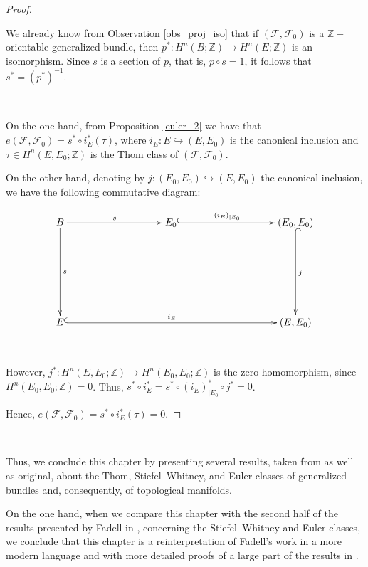 \documentclass[12pt,oneside]{book}
\newcommand{\Z}{\mathbb{Z}}
\begin{document}
    \begin{proof}

        \

    	We already know from Observation \ref{obs_proj_iso} that if $(\mathcal{F},\mathcal{F}_{0})$ is a $\Z-$orientable generalized bundle, 
        then $p^{*}:H^{n}(B;\Z)\to H^{n}(E;\Z)$ is an isomorphism. Since $s$ is a section of $p$, that is, $p\circ s=1$, it follows that 
        $s^{*}=(p^{*})^{-1}$.

        \

    	On the one hand, from Proposition \ref{euler_2} we have that $e(\mathcal{F},\mathcal{F}_{0})=s^{*}\circ i_{E}^{*}(\tau)$, 
        where $i_{E}:E\hookrightarrow (E,E_{0})$ is the canonical inclusion and $\tau\in H^{n}(E,E_{0};\Z)$ is the Thom 
        class of $(\mathcal{F},\mathcal{F}_{0})$.

    	On the other hand, denoting by $j:(E_{0},E_{0})\hookrightarrow (E,E_{0})$ the canonical inclusion, we have the following commutative 
        diagram:

    	$$ \xymatrix @C=0.5cm {
    		B \ar[rrrrr]^-{s} \ar[ddd]^-{s} &&&&& E_{0} \ar@{^(->}[rrrrr]^-{(i_{E})_{|E_{0}}} &&&&& (E_{0},E_{0}) \ar@{^(->}[ddd]^-{j} \\
    		&&&&& &&&&& \\
    		&&&&& &&&&& \\
    		E \ar@{^(->}[rrrrrrrrrr]^-{i_{E}} &&&&& &&&&& (E,E_{0})
    	} $$

        \

    	However, $j^{*}:H^{n}(E,E_{0};\Z)\to H^{n}(E_{0},E_{0};\Z)$ is the zero homomorphism, since $H^{n}(E_{0},E_{0};\Z)=0$. Thus, 
        $s^{*}\circ i_{E}^{*}=s^{*}\circ (i_{E})_{|E_{0}}^{*}\circ j^{*}=0$.

    	Hence, $e(\mathcal{F},\mathcal{F}_{0})=s^{*}\circ i_{E}^{*}(\tau)=0$.

    \end{proof}

    \

    Thus, we conclude this chapter by presenting several results, taken from \cite{fadell_1} as well as original, about the Thom, 
    Stiefel–Whitney, and Euler classes of generalized bundles and, consequently, of topological 
    manifolds.

    On the one hand, when we compare this chapter with the second half of the results presented by Fadell in \cite{fadell_1}, concerning the 
    Stiefel–Whitney and Euler classes, we conclude that this chapter is a reinterpretation of Fadell's work in a more modern language and 
    with more detailed proofs of a large part of the results in \cite{fadell_1}.
\end{document}
